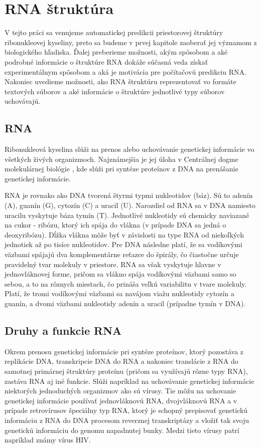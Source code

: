 

\chapter{RNA štruktúra}
V tejto práci sa venujeme automatickej predikcii priestorovej štruktúry ribonukleovej kyseliny, 
preto sa budeme v prvej kapitole zaoberať jej významom z biologického hľadiska. 
Ďalej preberieme možnosti, akým spôsobom a aké podrobné informácie o štruktúre RNA dokáže súčasná veda získať experimentálnym spôsobom a aká je motivácia pre počítačovú predikciu RNA.   
Nakoniec uvedieme možnosti, ako RNA štruktúru reprezentovať vo formáte textových súborov a aké informácie o štruktúre jednotlivé typy súborov uchovávajú. 

\section{RNA}
Ribonukleová kyselina slúži na prenos alebo uchovávanie genetickej informácie vo všetkých živých organizmoch. Najznámejšia je jej úloha v Centrálnej dogme molekulárnej biológie \cite{Crick70}, kde slúži pri syntéze proteínov z DNA na prenášanie genetickej informácie.


\indent RNA je rovnako ako DNA tvorená štyrmi typmi nukleotidov (báz). Sú to adenín (A), guanín (G), cytozín (C) a uracil (U).  Narozdiel od RNA sa v DNA namiesto uracilu vyskytuje báza tymín (T). Jednotlivé nukleotidy sú chemicky naviazané na cukor - ribózu, ktorý ich spája do vlákna (v prípade DNA sa jedná o deoxyribózu).
Dĺžka vlákna môže byť v závislosti na type RNA od niekoľkých jednotiek až po tisíce nukleotidov. Pre DNA následne platí, že sa vodíkovými väzbami spájajú dva komplementárne reťazce do špirály, čo čiastočne určuje pravidelný tvar molekuly v priestore. RNA sa však vyskytuje hlavne v  jednovláknovej forme, pričom sa vlákno spája vodíkovými väzbami samo so sebou, a to na rôznych miestach, čo prináša veľkú variabilitu v tvare molekuly. Platí, že tromi vodíkovými väzbami sa navájom viažu nukleotidy cytozín a guanín, a dvomi väzbami nukleotidy adenín a uracil (prípadne tymín v DNA).

\section{Druhy a funkcie RNA}
Okrem prenosu genetickej informácie pri syntéze proteínov, ktorý pozostáva z replikácie DNA, transkripcie DNA do RNA a nakoniec translácie z RNA do samotnej primárnej štruktúry proteínu (pričom sa využívajú rôzne typy RNA), zastáva RNA aj iné funkcie. Slúži napríklad na uchovávanie genetickej informácie niektorých jednoduchých organizmov ako sú vírusy. Tie môžu na uchovanie genetickej informácie používať jednovláknovú RNA, dvojvláknovú RNA a v prípade retrovírusov špeciálny typ RNA, ktorý je schopný prepisovať genetickú informáciu z RNA do DNA procesom reverznej transkriptázy a vložiť tak svoju genetickú informáciu do genomu napadnutej bunky. Medzi tieto vírusy patrí napríklad známy vírus HIV.  \cite{Krupovice18}


